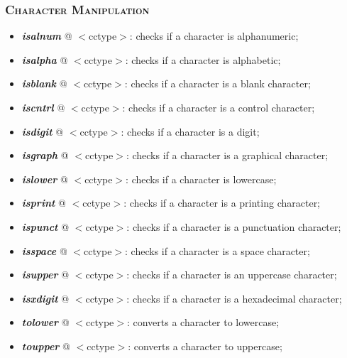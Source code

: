 \documentclass[10pt]{article}
\begin{document}
\begin{multicols*}{5}
{\subsubsection*{\textsc{Character Manipulation}} 
\begin{itemize}[leftmargin=*,topsep=0.25pt]
  \setlength\itemsep{-1.8pt}
\item  \emph{\textbf{isalnum}} @ $<$cctype$>$: checks if a character is alphanumeric;
\item  \emph{\textbf{isalpha}} @ $<$cctype$>$: checks if a character is alphabetic;
\item  \emph{\textbf{isblank}} @ $<$cctype$>$: checks if a character is a blank character;
\item  \emph{\textbf{iscntrl}} @ $<$cctype$>$: checks if a character is a control character;
\item  \emph{\textbf{isdigit}} @ $<$cctype$>$: checks if a character is a digit;
\item  \emph{\textbf{isgraph}} @ $<$cctype$>$: checks if a character is a graphical character;
\item  \emph{\textbf{islower}} @ $<$cctype$>$: checks if a character is lowercase;
\item  \emph{\textbf{isprint}} @ $<$cctype$>$: checks if a character is a printing character;
\item  \emph{\textbf{ispunct}} @ $<$cctype$>$: checks if a character is a punctuation character;
\item  \emph{\textbf{isspace}} @ $<$cctype$>$: checks if a character is a space character;
\item  \emph{\textbf{isupper}} @ $<$cctype$>$: checks if a character is an uppercase character;
\item  \emph{\textbf{isxdigit}} @ $<$cctype$>$: checks if a character is a hexadecimal character;
\item  \emph{\textbf{tolower}} @ $<$cctype$>$: converts a character to lowercase;
\item  \emph{\textbf{toupper}} @ $<$cctype$>$: converts a character to uppercase;
\end{itemize}


}
\end{multicols*}
\end{document}
